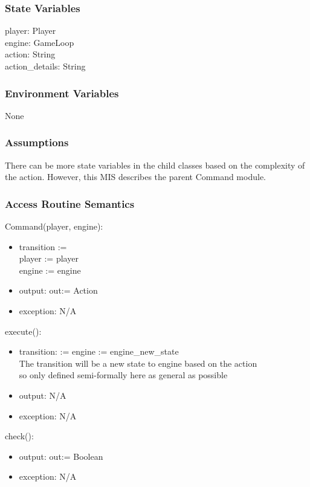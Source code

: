 \documentclass[12pt, titlepage]{article}
\begin{document}
\subsubsection{State Variables}
player: Player \\
engine: GameLoop \\
action: String \\
action\_details: String\\

\subsubsection{Environment Variables}
None

\subsubsection{Assumptions}
There can be more state variables in the child classes based on the complexity of the action. However, this MIS describes the parent Command module.

\subsubsection{Access Routine Semantics}

\noindent Command(player, engine):
\begin{itemize}
\item transition :=\\
player := player\\
engine := engine
\item output: out:= Action
\item exception: N/A
\end{itemize}

\noindent execute():
\begin{itemize}
\item transition: := engine := engine\_new\_state\\
The transition will be a new state to engine based on the action\\
so only defined semi-formally here as general as possible
\item output: N/A
\item exception: N/A
\end{itemize}

\noindent check():
\begin{itemize}
\item output: out:= Boolean
\item exception: N/A
\end{itemize}
\end{document}
